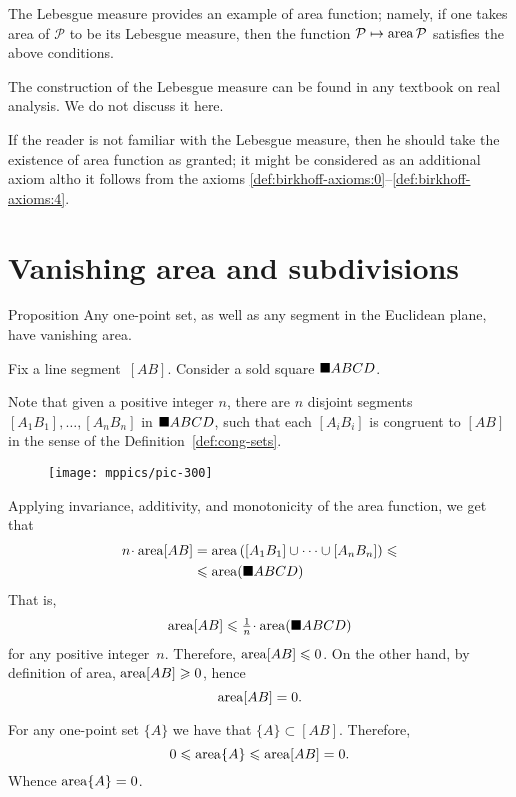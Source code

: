 {The Lebesgue measure provides an example of area function; 
namely, if one takes area of $\mathcal{P}$ to be its Lebesgue measure,
then the function $\mathcal{P}\mapsto\mathop{\rm area}\nolimits\mathcal{P}$ satisfies the above conditions.

The construction of the Lebesgue measure can be found in any textbook on real analysis.
We do not discuss it here.

If the reader is not familiar with the Lebesgue measure, then he should take the existence of area function as granted; 
it might be considered as an additional axiom altho it follows from the axioms \ref{def:birkhoff-axioms:0}--\ref{def:birkhoff-axioms:4}.

\section*{Vanishing area and subdivisions}

\begin{thm}{Proposition}\label{prop:area-segment}
Any one-point set, as well as any segment in the Euclidean plane, have vanishing area.
\end{thm}

Fix a line segment~$[AB]$.
Consider a sold square $\blacksquare ABCD$.

Note that given a positive integer $n$,
there are $n$ disjoint segments $[A_1B_1],\dots,[A_nB_n]$ 
in $\blacksquare ABCD$,
such that each $[A_iB_i]$ is congruent to $[AB]$ in the sense of the Definition~\ref{def:cong-sets}.


\begin{wrapfigure}[9]{o}{37 mm}
\vskip-2mm
\centering
\texttt{[image: mppics/pic-300]}
\end{wrapfigure}

Applying invariance, additivity, and monotonicity of the area function, 
we get that
\begin{align*}
n\cdot \area[AB]
&=\area\left([A_1B_1]\cup\dots\cup[A_nB_n]\right)\le
\\
&\le \area(\solidsquare ABCD)              
\end{align*}
That is,
\[\area[AB]\le \tfrac1n\cdot\area(\solidsquare ABCD)\] 
for any positive integer~$n$.
Therefore, $\mathop{\rm area}\nolimits[AB]\leqslant 0$.
On the other hand, by definition of area, $\mathop{\rm area}\nolimits[AB]\geqslant 0$,
hence
\[\mathop{\rm area}\nolimits[AB]= 0.\]

For any one-point set $\{A\}$ 
we have that $\{A\}\subset [AB]$.
Therefore, 
\[0\leqslant \mathop{\rm area}\nolimits\{A\}\leqslant \mathop{\rm area}\nolimits[AB]=0.\]
Whence $\mathop{\rm area}\nolimits\{A\}=0$.
\qeds

}
